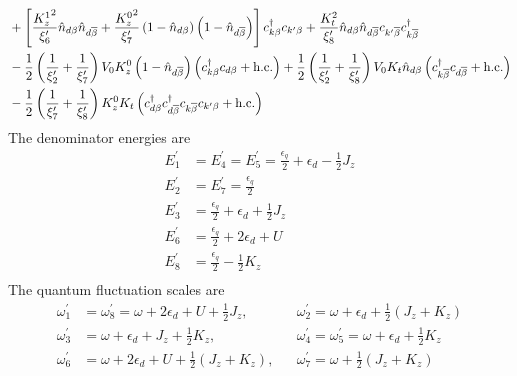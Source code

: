 \documentclass[12pt,twoside]{article}
\numberwithin{equation}{section}
\begin{document}
{\begin{equation}
\begin{aligned}
&+\left[\frac{{K_z^1}^2}{\xi^\prime_6}\hat n_{d\beta}\hat n_{d\overline\beta} + \frac{{K_z^0}^2}{\xi^\prime_7}\left(1 - \hat n_{d\beta}\right)\left(1 - \hat n_{d\overline\beta}\right)\right]c^\dagger_{k\beta}c_{k^\prime\beta} + \frac{K_t^2}{\xi^\prime_8}\hat n_{d\beta}\hat n_{d\overline\beta}c_{k^\prime\overline\beta}c^\dagger_{k\overline\beta} \\
&- \frac{1}{2}\left(\frac{1}{\xi^\prime_2} + \frac{1}{\xi^\prime_7}\right)V_0 K_z^0\left(1 - \hat n_{d\overline\beta}\right)\left(c^\dagger_{k\beta}c_{d\beta} + \text{h.c.}\right) + \frac{1}{2}\left(\frac{1}{\xi^\prime_2} + \frac{1}{\xi^\prime_8}\right)V_0 K_t\hat n_{d\beta}\left(c^\dagger_{k\overline\beta}c_{d\overline\beta} + \text{h.c.}\right) \\
&- \frac{1}{2}\left(\frac{1}{\xi^\prime_7} + \frac{1}{\xi^\prime_8}\right)K_z^0 K_t\left(c^\dagger_{d\beta}c^\dagger_{d\overline\beta}c_{k\overline\beta}c_{k^\prime\beta} + \text{h.c.}\right) 
\end{aligned}\end{equation}
The denominator energies are
\begin{equation}\begin{aligned}
	E_1^\prime &= E_4^\prime = E_5^\prime = \frac{\epsilon_q}{2} + \epsilon_d - \frac{1}{2}J_z\\
	E_2^\prime &= E_7^\prime = \frac{\epsilon_q}{2}\\
	E_3^\prime &= \frac{\epsilon_q}{2} + \epsilon_d + \frac{1}{2}J_z\\
	E_6^\prime &= \frac{\epsilon_q}{2} + 2\epsilon_d + U\\
	E_8^\prime &= \frac{\epsilon_q}{2} - \frac{1}{2}K_z\\
\end{aligned}\end{equation}
The quantum fluctuation scales are
\begin{equation}\begin{aligned}
	\omega_1^\prime&=\omega_8^\prime=\omega+2\epsilon_d+U+\frac{1}{2}J_z, &&\omega_2^\prime=\omega+\epsilon_d+\frac{1}{2}(J_z+K_z) \\
	\omega_3^\prime&=\omega+\epsilon_d+ J_z+\frac{1}{2}K_z, &&\omega_4^\prime=\omega_5^\prime=\omega+\epsilon_d+\frac{1}{2}K_z \\
	\omega_6^\prime&=\omega+2\epsilon_d+U+\frac{1}{2}(J_z+K_z), &&\omega_7^\prime=\omega+\frac{1}{2}(J_z+K_z)\\
\end{aligned}\end{equation}
}
\end{document}
